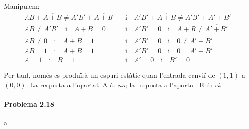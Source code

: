 Manipulem:
%
\begin{align*}
  AB + \overline{A+B} \neq A'B' + \overline{A+B}
    \quad &\text{i} \quad
  A'B' + \overline{A+B} \neq A'B' + \overline{A'+B'}
\\
  AB \neq A'B'
    \quad \text{i} \quad
  \overline{A+B} = 0
    \quad &\text{i} \quad
  A'B' = 0
    \quad \text{i} \quad
  \overline{A+B} \neq \overline{A'+B'}
\\
  AB \neq 0
    \quad \text{i} \quad
  A+B = 1
    \quad &\text{i} \quad
  A'B' = 0
    \quad \text{i} \quad
  0 \neq \overline{A'+B'}
\\
  AB = 1
    \quad \text{i} \quad
  A+B = 1
    \quad &\text{i} \quad
  A'B' = 0
    \quad \text{i} \quad
  0 = A'+B'
\\
  A = 1
    \quad \text{i} \quad
  B = 1
    \quad &\text{i} \quad
  A' = 0
    \quad \text{i} \quad
  B' = 0
\end{align*}

Per tant, només es produïrà un espuri estàtic quan l'entrada canviï de $\left(1,1\right)$ a $\left(0,0\right)$. La resposta a l'apartat~A és \emph{no}; la resposta a l'apartat~B és \emph{sí}.

\finishpage


\page
\paragraph{Problema 2.18}

a


\finishpage


